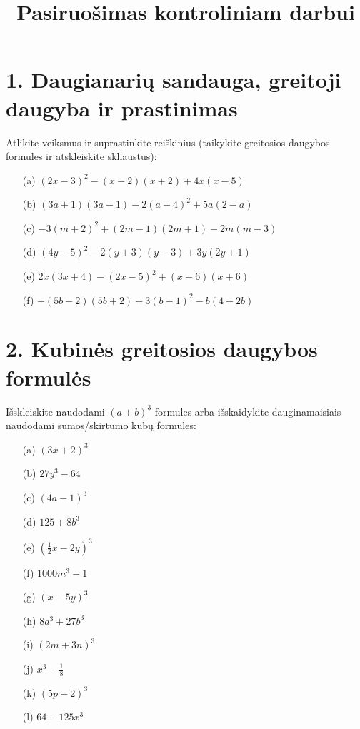 \documentclass[12pt, a4paper]{article}
\title{\textbf{Pasiruošimas kontroliniam darbui}}
\author{}
\date{}
\begin{document}
\maketitle

\section*{1. Daugianarių sandauga, greitoji daugyba ir prastinimas}
Atlikite veiksmus ir suprastinkite reiškinius (taikykite greitosios daugybos formules ir atskleiskite skliaustus):
\begin{enumerate}
    \item[(a)] $(2x - 3)^2 - (x - 2)(x + 2) + 4x(x - 5)$
    \item[(b)] $(3a + 1)(3a - 1) - 2(a - 4)^2 + 5a(2 - a)$
    \item[(c)] $-3(m + 2)^2 + (2m - 1)(2m + 1) - 2m(m - 3)$
    \item[(d)] $(4y - 5)^2 - 2(y + 3)(y - 3) + 3y(2y + 1)$
    \item[(e)] $2x(3x + 4) - (2x - 5)^2 + (x - 6)(x + 6)$
    \item[(f)] $-(5b - 2)(5b + 2) + 3(b - 1)^2 - b(4 - 2b)$
\end{enumerate}

\section*{2. Kubinės greitosios daugybos formulės}
Išskleiskite naudodami $(a \pm b)^3$ formules arba išskaidykite dauginamaisiais naudodami sumos/skirtumo kubų formules:
\begin{multicols}{3}
\begin{enumerate}
    \item[(a)] $(3x + 2)^3$
    \item[(b)] $27y^3 - 64$
    \item[(c)] $(4a - 1)^3$
    \item[(d)] $125 + 8b^3$
    \item[(e)] $\left(\frac{1}{2}x - 2y\right)^3$
    \item[(f)] $1000m^3 - 1$
    \item[(g)] $(x - 5y)^3$
    \item[(h)] $8a^3 + 27b^3$
    \item[(i)] $(2m + 3n)^3$
    \item[(j)] $x^3 - \frac{1}{8}$
    \item[(k)] $(5p - 2)^3$
    \item[(l)] $64 - 125x^3$
\end{enumerate}
\end{multicols}
\end{document}
